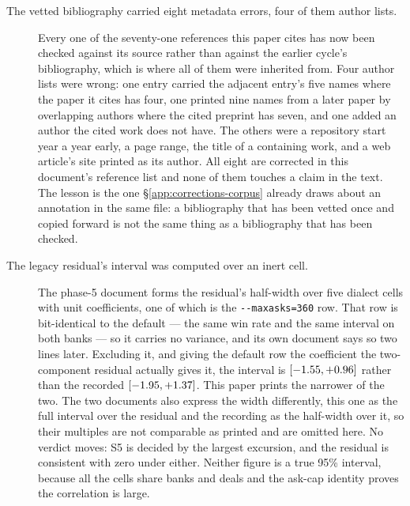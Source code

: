 \begin{description}
\item[The vetted bibliography carried eight metadata errors, four of them author lists.] Every one of
  the seventy-one references this paper cites has now been checked against its source rather
  than against the earlier cycle's bibliography, which is where all of them were inherited from. Four
  author lists were wrong: one entry carried the adjacent entry's five names where the paper it cites
  has four, one printed nine names from a later paper by overlapping authors where the cited preprint
  has seven, and one added an author the cited work does not have. The others were a repository start
  year a year early, a page range, the title of a containing work, and a web article's site printed as
  its author. All eight are corrected in this document's reference list and none of them touches a
  claim in the text. The lesson is the one \S\ref{app:corrections-corpus} already draws about an
  annotation in the same file: a bibliography that has been vetted once and copied forward is not the
  same thing as a bibliography that has been checked.

\item[The legacy residual's interval was computed over an inert cell.] The phase-5 document forms
  the residual's half-width over five dialect cells with unit coefficients, one of which is the
  \texttt{-{}-maxasks=360} row. That row is bit-identical to the default --- the same win rate and
  the same interval on both banks --- so it carries no variance, and its own document says so two
  lines later. Excluding it, and giving the default row the coefficient the two-component residual
  actually gives it, the interval is
  $[-1.55, +0.96]$ rather than the recorded
  $[-1.95, +1.37]$. This paper prints the
  narrower of the two. The two documents also express the width differently, this one as the full
  interval over the residual and the recording as the half-width over it, so their multiples are not
  comparable as printed and are omitted here. No verdict moves:
  S5 is decided by the largest excursion, and the residual is consistent with zero under either.
  Neither figure is a true 95\% interval, because all the cells share banks and deals and the
  ask-cap identity proves the correlation is large.


\end{description}

